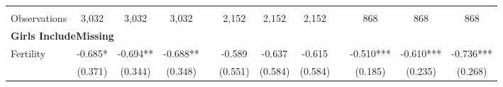 \begin{landscape}
\begin{table}[htpb!]
\begin{center}
\begin{tabular}{lcccp{2mm}cccp{2mm}ccc}
\begin{footnotesize}\end{footnotesize}&\begin{footnotesize}\end{footnotesize}&\begin{footnotesize}\end{footnotesize}&\begin{footnotesize}\end{footnotesize}&\begin{footnotesize}\end{footnotesize}&\begin{footnotesize}\end{footnotesize}&\begin{footnotesize}\end{footnotesize}&\begin{footnotesize}\end{footnotesize}&\begin{footnotesize}\end{footnotesize}&\begin{footnotesize}\end{footnotesize}&\begin{footnotesize}\end{footnotesize}&\begin{footnotesize}\end{footnotesize}\\Observations&3,032&3,032&3,032&&2,152&2,152&2,152&&868&868&868\\
\multicolumn{12}{l}{\textbf{Girls IncludeMissing}}\\ 
Fertility&-0.685*&-0.694**&-0.688**&&-0.589&-0.637&-0.615&&-0.510***&-0.610***&-0.736***\\
&(0.371)&(0.344)&(0.348)&&(0.551)&(0.584)&(0.584)&&(0.185)&(0.235)&(0.268)\\

\end{tabular}
\end{center}
\end{table}
\end{landscape}
